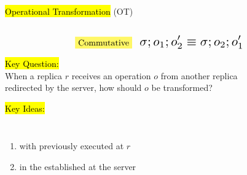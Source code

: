 \begin{frame}{}
  \centerline{\hl{Operational Transformation} (OT)~}

  \begin{columns}
      \begin{center}
	
      \end{center}
      \begin{center}
	
      \end{center}
  \end{columns}
\end{frame}

\begin{frame}{}

  \begin{equation*}
    \text{\hl{Commutative}\;\; \resizebox{0.35\textwidth}{!}{$\sigma; o_1; o_2' \equiv \sigma; o_2; o_1'$}}
  \end{equation*}

  \centerline{}
\end{frame}

\begin{frame}{}
  \begin{center}
    \resizebox{0.75\textwidth}{!}{}
  \end{center}
\end{frame}

\begin{frame}{}
  \begin{center}
    \hl{Key Question:} \\[8pt]
    When a replica $r$ receives an operation $o$ from another replica \\ redirected by the server,
    how should $o$ be transformed?
  
    \pause
    \vspace{0.80cm}

    \pause
    \vspace{0.80cm}

    \hl{Key Ideas:} \\[6pt]
    \begin{columns}
	\begin{enumerate}
	  \item with  previously executed at $r$
	  \item in the  established at the server
	\end{enumerate}
    \end{columns}
  \end{center}
\end{frame}

